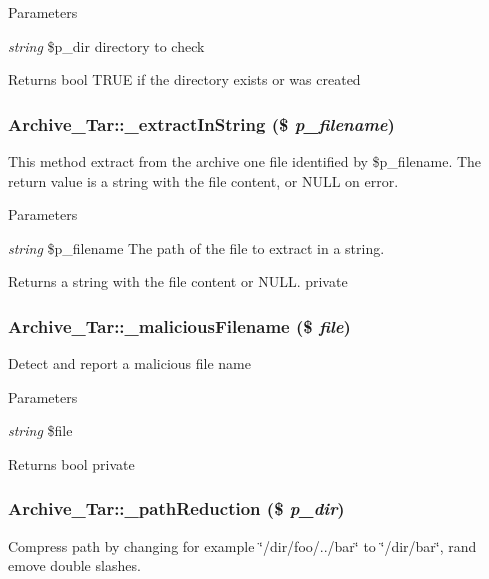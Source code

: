 \begin{DoxyParams}{Parameters}
\item[{\em string}]\$p\_\-dir directory to check\end{DoxyParams}
\begin{DoxyReturn}{Returns}
bool TRUE if the directory exists or was created 
\end{DoxyReturn}
\hypertarget{classArchive__Tar_a837d36c147a1d6cddcc8ec4f3ed64239}{
\subsubsection[{\_\-extractInString}]{\setlength{\rightskip}{0pt plus 5cm}Archive\_\-Tar::\_\-extractInString (\$ {\em p\_\-filename})}}
\label{classArchive__Tar_a837d36c147a1d6cddcc8ec4f3ed64239}
This method extract from the archive one file identified by \$p\_\-filename. The return value is a string with the file content, or NULL on error. 
\begin{DoxyParams}{Parameters}
\item[{\em string}]\$p\_\-filename The path of the file to extract in a string. \end{DoxyParams}
\begin{DoxyReturn}{Returns}
a string with the file content or NULL.  private 
\end{DoxyReturn}
\hypertarget{classArchive__Tar_aad06c4df6c3834d7c6f4a468d81bceb3}{
\subsubsection[{\_\-maliciousFilename}]{\setlength{\rightskip}{0pt plus 5cm}Archive\_\-Tar::\_\-maliciousFilename (\$ {\em file})}}
\label{classArchive__Tar_aad06c4df6c3834d7c6f4a468d81bceb3}
Detect and report a malicious file name


\begin{DoxyParams}{Parameters}
\item[{\em string}]\$file \end{DoxyParams}
\begin{DoxyReturn}{Returns}
bool  private 
\end{DoxyReturn}
\hypertarget{classArchive__Tar_a54cee929a78e7c18005e71af154f0f65}{
\subsubsection[{\_\-pathReduction}]{\setlength{\rightskip}{0pt plus 5cm}Archive\_\-Tar::\_\-pathReduction (\$ {\em p\_\-dir})}}
\label{classArchive__Tar_a54cee929a78e7c18005e71af154f0f65}
Compress path by changing for example \char`\"{}/dir/foo/../bar\char`\"{} to \char`\"{}/dir/bar\char`\"{}, rand emove double slashes.


